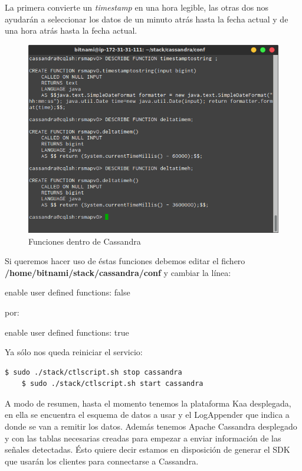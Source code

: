 \bigskip

La primera convierte un \textit{timestamp} en una hora legible, las otras dos nos ayudarán a seleccionar los datos de un minuto atrás hasta la fecha actual y de una hora atrás hasta la fecha actual.

\begin{figure}[!ht]
  \begin{center}
    \includegraphics[scale=0.65]{../images/cassandra/5.png}
		\caption{Funciones dentro de Cassandra}
    \label{fig:kaa}
	\end{center}
\end{figure}

\newpage

Si queremos hacer uso de éstas funciones debemos editar el fichero \textbf{/home/bitnami/stack/cassandra/conf} y cambiar la línea:

enable user defined functions: false

por:

enable user defined functions: true

\bigskip

Ya sólo nos queda reiniciar el servicio:

\begin{lstlisting}[language=bash,caption={Reiniciando Cassandra},label={lst:rcas}]
	$ sudo ./stack/ctlscript.sh stop cassandra
	$ sudo ./stack/ctlscript.sh start cassandra
\end{lstlisting}

A modo de resumen, hasta el momento tenemos la plataforma Kaa desplegada, en ella se encuentra el esquema de datos a usar y el LogAppender que indica a donde se van a remitir los datos. Además tenemos Apache Cassandra desplegado y con las tablas necesarias creadas para empezar a enviar información de las señales detectadas. Ésto quiere decir estamos en disposición de generar el SDK que usarán los clientes para connectarse a Cassandra.

